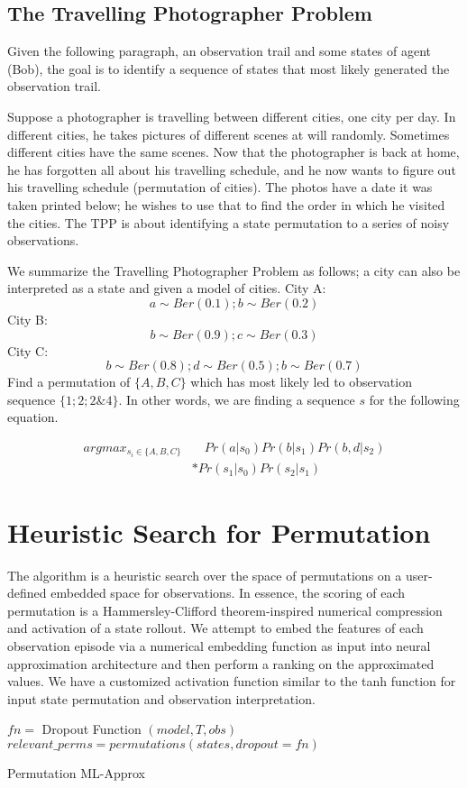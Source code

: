 \documentclass[10pt, conference, compsocconf]{IEEEtran}
\begin{document}
\subsection{The Travelling Photographer Problem}
 Given the following paragraph, an observation trail and some states of agent (Bob), the goal is to identify a sequence of states that most likely generated the observation trail.

Suppose a photographer is travelling between different cities, one city per day. In different cities, he takes pictures of different scenes at will randomly. Sometimes different cities have the same scenes. Now that the photographer is back at home, he has forgotten all about his travelling schedule, and he now wants to figure out his travelling schedule (permutation of cities). The photos have a date it was taken printed below; he wishes to use that to find the order in which he visited the cities. The TPP is about identifying a state permutation to a series of noisy observations. 

We summarize the Travelling Photographer Problem as follows; a city can also be interpreted as a state and given a model of cities. 
City A: $$a \sim Ber(0.1); b \sim Ber(0.2)$$ City B: $$b \sim Ber(0.9); c \sim Ber(0.3) $$ City C: $$b \sim Ber(0.8); d \sim Ber(0.5); 
b \sim Ber(0.7)$$ Find a permutation of $\{A, B, C\}$ which has most likely led to observation sequence $\{1;2;2\&4\}$. In other words, we are finding a sequence $s$ for the following equation. 

\begin{align}
   argmax_{s_i \in \{A, B, C\}} &\quad Pr(a|s_0)Pr(b|s_1)Pr(b,d|s_2)    \\                                  &*Pr(s_1|s_0)Pr(s_2|s_1)
\end{align}

\section{Heuristic Search for Permutation}
The algorithm is a heuristic search over the space of permutations on a user-defined embedded space for observations. In essence, the scoring of each permutation is a Hammersley-Clifford theorem-inspired numerical compression and activation of a state rollout. We attempt to embed the features of each observation episode via a numerical embedding function as input into neural approximation architecture and then perform a ranking on the approximated values. We have a customized activation function similar to the tanh function for input state permutation and observation interpretation. 
\begin{algorithm}[h]
$fn = $ {\sc Dropout Function} $(model, T, obs)$ \;
$relevant\_perms =  permutations(states, dropout = fn) $\;
\caption{{\sc Permutation ML-Approx}}
\label{algo:perm_ml_approx}
\end{algorithm}
\end{document}
